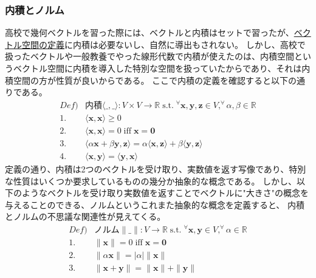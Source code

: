 \documentclass[10pt]{ujarticle}
\begin{document}
\subsubsection{内積とノルム}
高校で幾何ベクトルを習った際には、ベクトルと内積はセットで習ったが、\hyperlink{vecsp}{ベクトル空間の定義}に内積は必要ないし、自然に導出もされない。
しかし、高校で扱ったベクトルや一般教養でやった線形代数で内積が使えたのは、内積空間というベクトル空間に内積を導入した特別な空間を扱っていたからであり、それは内積空間の方が性質が良いからである。
ここで内積の定義を確認すると以下の通りである。
$$
\begin{aligned}
  Def)&\text{内積}\langle\_,\_\rangle:V\times V\rightarrow\mathbb{R}\;\text{s.t.}\;^\forall\mathbf{x},\mathbf{y},\mathbf{z}\in V,^\forall\alpha,\beta\in\mathbb{R}\\
  1.&\langle\mathbf{x},\mathbf{x}\rangle\geq 0\\
  2.&\langle\mathbf{x},\mathbf{x}\rangle=0\;\text{iff}\;\mathbf{x}=\mathbf{0}\\
  3.&\langle\alpha\mathbf{x}+\beta\mathbf{y},\mathbf{z}\rangle=\alpha\langle\mathbf{x},\mathbf{z}\rangle+\beta\langle\mathbf{y},\mathbf{z}\rangle\\
  4.&\langle\mathbf{x},\mathbf{y}\rangle=\langle\mathbf{y},\mathbf{x}\rangle
\end{aligned}
$$
定義の通り、内積は2つのベクトルを受け取り、実数値を返す写像であり、特別な性質はいくつか要求しているものの幾分か抽象的な概念である。
しかし、以下のようなベクトルを受け取り実数値を返すことでベクトルに"大きさ"の概念を与えることのできる、ノルムというこれまた抽象的な概念を定義すると、
内積とノルムの不思議な関連性が見えてくる。
$$
\begin{aligned}
  Def)&\text{ノルム}\|\_\|:V\rightarrow\mathbb{R}\;\text{s.t.}\;^\forall\mathbf{x},\mathbf{y}\in V,^\forall\alpha\in\mathbb{R}\\
  1.&\|\mathbf{x}\|=0\;\text{iff}\;\mathbf{x}=\mathbf{0}\\
  2.&\|\alpha\mathbf{x}\|=|\alpha|\|\mathbf{x}\|\\
  3.&\|\mathbf{x}+\mathbf{y}\|=\|\mathbf{x}\|+\|\mathbf{y}\|
\end{aligned}
$$
\end{document}
